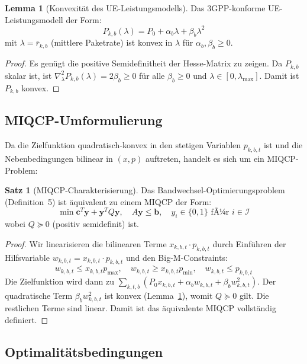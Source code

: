﻿\documentclass[a4paper,12pt]{article}
\theoremstyle{definition}
\newtheorem{satz}{Satz}
\newtheorem{lemma}{Lemma}
\begin{document}
\begin{lemma}[Konvexit\"at des UE-Leistungsmodells]
\label{lem:power_convex}
  Das 3GPP-konforme UE-Leistungsmodell der Form:
  \[
    P_{k,b}(\lambda) = P_0 + \alpha_b \lambda + \beta_b \lambda^2
  \]
  mit $\lambda = \bar{r}_{k,b}$ (mittlere Paketrate) ist konvex in $\lambda$
  f\"ur $\alpha_b, \beta_b \geq 0$.
\end{lemma}

\begin{proof}
  Es gen\"ugt die positive Semidefinitheit der Hesse-Matrix zu zeigen.
  Da $P_{k,b}$ skalar ist, ist $\nabla^2_\lambda P_{k,b}(\lambda) = 2\beta_b \geq 0$
  f\"ur alle $\beta_b \geq 0$ und $\lambda \in [0, \lambda_{\max}]$.
  Damit ist $P_{k,b}$ konvex.
\end{proof}

\subsection{MIQCP-Umformulierung}

Da die Zielfunktion quadratisch-konvex in den stetigen Variablen $p_{k,b,t}$ ist und
die Nebenbedingungen bilinear in $(x, p)$ auftreten, handelt es sich um ein MIQCP-Problem:

\begin{satz}[MIQCP-Charakterisierung]
  Das Bandwechsel-Optimierungsproblem (Definition~5) ist \"aquivalent zu einem MIQCP der Form:
  \[
    \min \mathbf{c}^T \mathbf{y} + \mathbf{y}^T Q \mathbf{y}, \quad
    A\mathbf{y} \leq \mathbf{b}, \quad
    y_i \in \{0,1\} \text{ fÃ¼r } i \in \mathcal{I}
  \]
  wobei $Q \succeq 0$ (positiv semidefinit) ist.
\end{satz}

\begin{proof}
  Wir linearisieren die bilinearen Terme $x_{k,b,t} \cdot p_{k,b,t}$ durch
  Einf\"uhren der Hilfsvariable $w_{k,b,t} = x_{k,b,t} \cdot p_{k,b,t}$
  und den Big-M-Constraints:
  \[
    w_{k,b,t} \leq x_{k,b,t} p_{\max}, \quad
    w_{k,b,t} \geq x_{k,b,t} p_{\min}, \quad
    w_{k,b,t} \leq p_{k,b,t}
  \]
  Die Zielfunktion wird dann zu $\sum_{k,t,b} (P_0 x_{k,b,t} + \alpha_b w_{k,b,t}
  + \beta_b w_{k,b,t}^2)$.
  Der quadratische Term $\beta_b w_{k,b,t}^2$ ist konvex (Lemma~\ref{lem:power_convex}),
  womit $Q \succeq 0$ gilt. Die restlichen Terme sind linear. Damit ist das
  \"aquivalente MIQCP vollst\"andig definiert.
\end{proof}

\subsection{Optimalit\"atsbedingungen}
\end{document}
